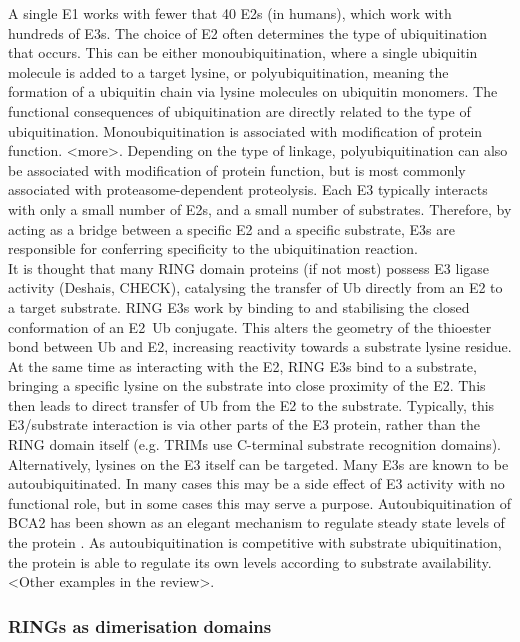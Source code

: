 \documentclass[12pt]{"article"}
\begin{document}
A single E1 works with fewer that 40 E2s (in humans), which work with hundreds of E3s. The choice of E2 often determines the type of ubiquitination that occurs. This can be either monoubiquitination, where a single ubiquitin molecule is added to a target lysine, or polyubiquitination, meaning the formation of a ubiquitin chain via lysine molecules on ubiquitin monomers. The functional consequences of ubiquitination are directly related to the type of ubiquitination. Monoubiquitination is associated with modification of protein function. <more>. Depending on the type of linkage, polyubiquitination can also be associated with modification of protein function, but is most commonly associated with proteasome-dependent proteolysis. Each E3 typically interacts with only a small number of E2s, and a small number of substrates. Therefore, by acting as a bridge between a specific E2 and a specific substrate, E3s are responsible for conferring specificity to the ubiquitination reaction.\\

It is thought that many RING domain proteins (if not most) possess E3 ligase activity (Deshais, CHECK), catalysing the transfer of Ub directly from an E2 to a target substrate. RING E3s work by binding to and stabilising the closed conformation of an E2~Ub conjugate. This alters the geometry of the thioester bond between Ub and E2, increasing reactivity towards a substrate lysine residue. At the same time as interacting with the E2, RING E3s bind to a substrate, bringing a specific lysine on the substrate into close proximity of the E2. This then leads to direct transfer of Ub from the E2 to the substrate. Typically, this E3/substrate interaction is via other parts of the E3 protein, rather than the RING domain itself (e.g. TRIMs use C-terminal substrate recognition domains). \\

Alternatively, lysines on the E3 itself can be targeted. Many E3s are known to be autoubiquitinated. In many cases this may be a side effect of E3 activity with no functional role, but in some cases this may serve a purpose. Autoubiquitination of BCA2 has been shown as an elegant mechanism to regulate steady state levels of the protein \citep{Amemiya2008}. As autoubiquitination is competitive with substrate ubiquitination, the protein is able to regulate its own levels according to substrate availability. <Other examples in the review>.\\


\subsubsection{RINGs as dimerisation domains}
\end{document}
